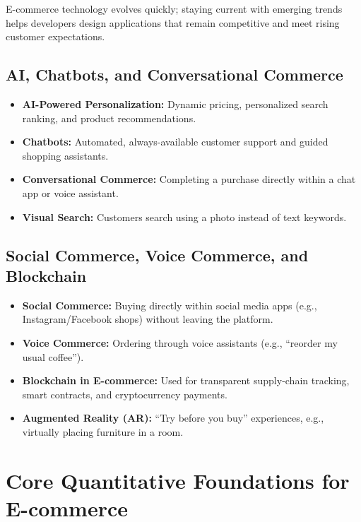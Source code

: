 \documentclass[11pt,a4paper]{article}
\begin{document}
\begin{definitionbox}
E-commerce technology evolves quickly; staying current with emerging trends helps developers design applications that remain competitive and meet rising customer expectations.
\end{definitionbox}

\subsection{AI, Chatbots, and Conversational Commerce}
\begin{itemize}[leftmargin=*]
  \item \textbf{AI-Powered Personalization:} Dynamic pricing, personalized search ranking, and product recommendations.
  \item \textbf{Chatbots:} Automated, always-available customer support and guided shopping assistants.
  \item \textbf{Conversational Commerce:} Completing a purchase directly within a chat app or voice assistant.
  \item \textbf{Visual Search:} Customers search using a photo instead of text keywords.
\end{itemize}

\subsection{Social Commerce, Voice Commerce, and Blockchain}
\begin{conceptbox}
\begin{itemize}[leftmargin=*]
  \item \textbf{Social Commerce:} Buying directly within social media apps (e.g., Instagram/Facebook shops) without leaving the platform.
  \item \textbf{Voice Commerce:} Ordering through voice assistants (e.g., ``reorder my usual coffee'').
  \item \textbf{Blockchain in E-commerce:} Used for transparent supply-chain tracking, smart contracts, and cryptocurrency payments.
  \item \textbf{Augmented Reality (AR):} ``Try before you buy'' experiences, e.g., virtually placing furniture in a room.
\end{itemize}
\end{conceptbox}

\section{Core Quantitative Foundations for E-commerce}
\end{document}
